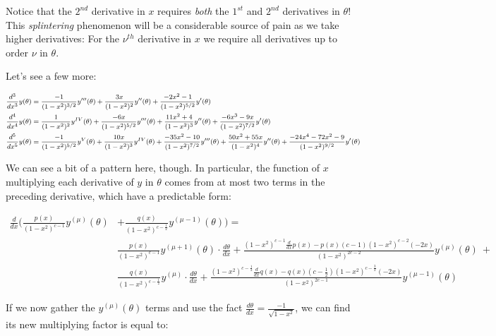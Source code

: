 \documentclass[10pt]{article}
\begin{document}
Notice that the $2^{nd}$ derivative in $x$ requires \textit{both} the $1^{st}$ and $2^{nd}$ derivatives in $\theta$! This \textit{splintering} phenomenon will be a considerable source of pain as we take higher derivatives: For the $\nu^{th}$ derivative in $x$ we require all derivatives up to order $\nu$ in $\theta$.

Let's see a few more:

\begin{equation}\label{derivatives}
\footnotesize
\begin{aligned}
\frac{d^3}{dx^3} y(\theta) &= \frac{-1}{(1-x^2)^{3/2}} y'''(\theta) + \frac{3x}{(1-x^2)^2} y''(\theta) + \frac{-2x^2 - 1}{(1-x^2)^{5/2}} y'(\theta)\\
\frac{d^4}{dx^4} y(\theta) &= \frac{1}{(1-x^2)^2} y^{IV}(\theta) + \frac{-6x}{(1-x^2)^{5/2}} y'''(\theta) + \frac{11x^2 + 4}{(1-x^2)^3} y''(\theta) + \frac{-6x^3 - 9x}{(1-x^2)^{7/2}} y'(\theta)\\
\frac{d^5}{dx^5} y(\theta) &= \frac{-1}{(1-x^2)^{5/2}} y^V(\theta) + \frac{10x}{(1-x^2)^3} y^{IV}(\theta) + \frac{-35x^2-10}{(1-x^2)^{7/2}} y'''(\theta) + \frac{50x^2 + 55x}{(1-x^2)^4} y''(\theta) + \frac{-24x^4 -72x^2 - 9}{(1-x^2)^{9/2}} y'(\theta)\\
\end{aligned}
\normalsize
\end{equation}

We can see a bit of a pattern here, though. In particular, the function of $x$ multiplying each derivative of $y$ in $\theta$ comes from at most two terms in the preceding derivative, which have a predictable form:\vspace{-2mm}

\begin{align*}
\frac{d}{dx} \Big( \frac{p(x)}{(1-x^2)^{c-1}} y^{(\mu)}(\theta) &+ \frac{q(x)}{(1-x^2)^{c -\frac{1}{2}}} y^{(\mu-1)}(\theta) \Big) = \\
&\frac{p(x)}{(1-x^2)^{c-1}} y^{(\mu+1)}(\theta) \cdot \frac{d\theta}{dx} + \frac{(1 - x^2)^{c-1} \frac{d}{dx} p(x) - p(x)(c-1)(1-x^2)^{c-2}(-2x)}{(1-x^2)^{2c - 2}} y^{(\mu)}(\theta)\ +\\
&\frac{q(x)}{(1-x^2)^{c-\frac{1}{2}}} y^{(\mu)} \cdot \frac{d\theta}{dx} + \frac{(1 - x^2)^{c-\frac{1}{2}} \frac{d}{dx} q(x) - q(x)(c-\frac{1}{2})(1-x^2)^{c-\frac{3}{2}}(-2x)}{(1-x^2)^{2c - 1}} y^{(\mu-1)}(\theta)
\end{align*} 

If we now gather the $y^{(\mu)}(\theta)$ terms and use the fact $\frac{d\theta}{dx} = \frac{-1}{\sqrt{1-x^2}}$, we can find its new multiplying factor is equal to:\vspace{-2mm}
\end{document}
